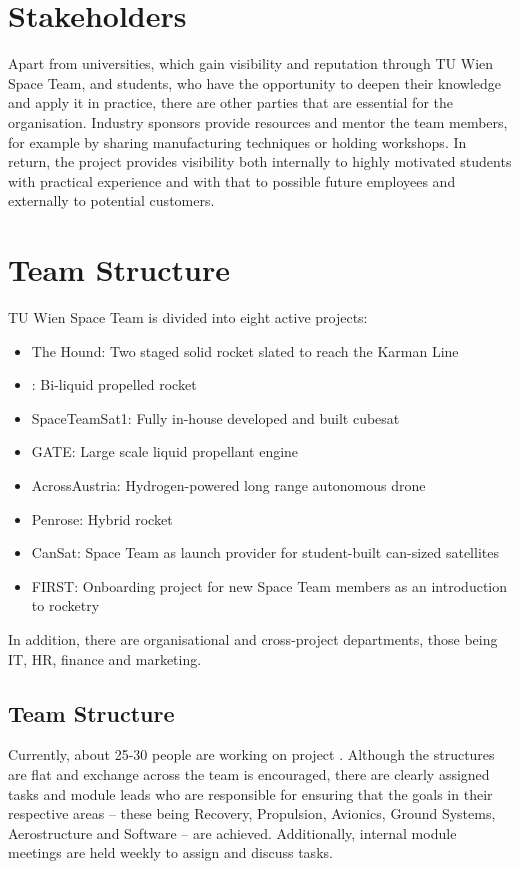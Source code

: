 \section{Stakeholders}
Apart from universities, which gain visibility and reputation through TU Wien Space Team, and students, who have the opportunity to deepen their knowledge and apply it in practice, there are other parties that are essential for the organisation.
Industry sponsors provide resources and mentor the team members, for example by sharing manufacturing techniques or holding workshops. In return, the project provides visibility both internally to highly motivated students with practical experience and with that to possible future employees and externally to potential customers.

\section{Team Structure} %
TU Wien Space Team is divided into eight active projects:
\begin{itemize}
\item The Hound: Two staged solid rocket slated to reach the Karman Line
\item \uH: Bi-liquid propelled rocket
\item SpaceTeamSat1: Fully in-house developed and built cubesat
\item GATE: Large scale liquid propellant engine
\item AcrossAustria: Hydrogen-powered long range autonomous drone
\item Penrose: Hybrid rocket
\item CanSat: Space Team as launch provider for student-built can-sized satellites
\item FIRST: Onboarding project for new Space Team members as an introduction to rocketry
\end{itemize}
In addition, there are organisational and cross-project departments, those being IT, HR, finance and marketing.

\subsection{\uH Team Structure} 
Currently, about 25-30 people are working on project \uH. Although the structures are flat and exchange across the team is encouraged, there are clearly assigned tasks and module leads who are responsible for ensuring that the goals in their respective areas -- these being Recovery, Propulsion, Avionics, Ground Systems, Aerostructure and Software -- are achieved. Additionally, internal module meetings are held weekly to assign and discuss tasks. 

